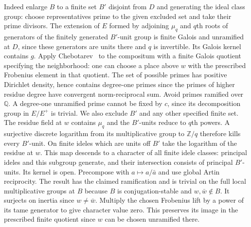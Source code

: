 Indeed enlarge $B$ to a finite set $B'$ disjoint from $D$ and generating
the ideal class group: choose representatives prime to the given excluded
set and take their prime divisors. The extension of $E$ formed by adjoining $\mu_q$
and $q$th roots of generators of the finitely generated $B'$-unit group
is finite Galois and unramified at $D$, since these generators are units
there and $q$ is invertible. Its Galois kernel contains $g$. Apply
Chebotarev~\cite[Theorem~8.31]{milneANT} to the compositum with a finite Galois quotient specifying
the neighborhood: one can choose a place above $w$ with the prescribed
Frobenius element in that quotient. The set of possible primes has
positive Dirichlet density, hence contains degree-one primes since
the primes of higher residue degree have convergent norm-reciprocal sum.
Avoid primes ramified over $\mathbb Q$. A degree-one unramified prime
cannot be fixed by $c$, since its decomposition group in $E/E^+$ is trivial.
We also exclude $B'$ and any other specified finite set.
The residue field at $w$ contains $\mu_q$ and the $B'$-units reduce
to $q$th powers. A surjective discrete logarithm from its multiplicative
group to $\mathbb Z/q$ therefore kills every $B'$-unit.
On finite ideles which are units off $B'$ take the logarithm of
the residue at $w$. This map descends to a character of all finite idele
classes: principal ideles and this subgroup generate, and their
intersection consists of principal $B'$-units. Its kernel is open.
Precompose with $a\mapsto a/\bar a$ and use global Artin reciprocity.
The result has the claimed ramification and is trivial on the full local
multiplicative groups at $B$ because $B$ is conjugation-stable and
$w,\bar w\notin B$. It surjects on inertia since $w\ne\bar w$.
Multiply the chosen Frobenius lift by a power of its tame generator to
give character value zero. This preserves its image in the prescribed
finite quotient since $w$ can be chosen unramified there.

